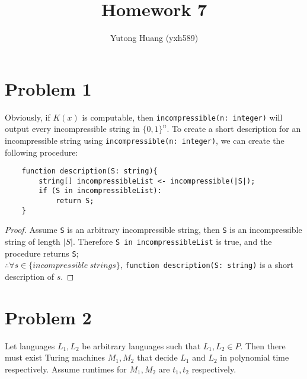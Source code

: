 \documentclass[letterpaper]{article}
\title{\vspace{-2cm}Homework 7}
\author{Yutong Huang (yxh589)}
\date{}
\begin{document}
\maketitle
\section*{Problem 1}
Obviously, if $K(x)$ is computable, then \verb|incompressible(n: integer)| will output every incompressible
string in $\{0,1\}^n$. To create a short description for an incompressible string using \verb|incompressible(n: integer)|,
we can create the following procedure:
\begin{verbatim}
    function description(S: string){
        string[] incompressibleList <- incompressible(|S|);
        if (S in incompressibleList):
            return S;
    }
\end{verbatim}
\begin{proof}
    Assume \verb|S| is an arbitrary incompressible string, then \verb|S| is an incompressible string
    of length $|S|$. Therefore \verb|S in incompressibleList| is true, and the procedure returns \verb|S|;\\
    $\therefore \forall s \in \{incompressible\ strings\}$, \verb|function description(S: string)| is a short description of $s$.
\end{proof}

\section*{Problem 2}
Let languages $L_1, L_2$ be arbitrary languages such that $L_1, L_2 \in P$. Then there must exist Turing machines $M_1, M_2$ that
decide $L_1$ and $L_2$ in polynomial time respectively. Assume runtimes for $M_1, M_2$ are $t_1, t_2$ respectively.\\
\end{document}
